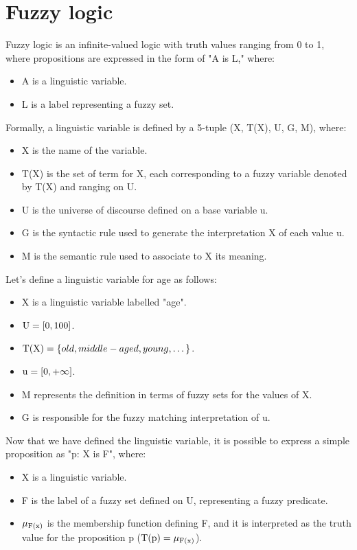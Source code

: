 \documentclass[12pt, a4paper]{report}
\begin{document}
    \section{Fuzzy logic}
    Fuzzy logic is an infinite-valued logic with truth values ranging from 0 to 1, where propositions are expressed in the form of "A is L," where:
    \begin{itemize}
        \item A is a linguistic variable.
        \item L is a label representing a fuzzy set.
    \end{itemize}
    Formally, a linguistic variable is defined by a 5-tuple (X, T(X), U, G, M), where: 
    \begin{itemize}
        \item X is the name of the variable.
        \item T(X) is the set of term for X, each corresponding to a fuzzy variable denoted by T(X) and ranging on U.
        \item U is the universe of discourse defined on a base variable u.
        \item G is the syntactic rule used to generate the interpretation X of each value u.
        \item M is the semantic rule used to associate to X its meaning.
    \end{itemize}
    \begin{example}
        Let's define a linguistic variable for age as follows:
        \begin{itemize}
            \item X is a linguistic variable labelled "age".
            \item $\textnormal{U}=[0,100]$.
            \item $\textnormal{T(X)}=\{old, middle-aged, young, \dots\}$.
            \item $\textnormal{u}=[0,+\infty]$.
            \item M represents the definition in terms of fuzzy sets for the values of X.
            \item G is responsible for the fuzzy matching interpretation of u.
        \end{itemize}
    \end{example}
    Now that we have defined the linguistic variable, it is possible to express a simple proposition as "p: X is F", where:
    \begin{itemize}
        \item X is a linguistic variable.
        \item F is the label of a fuzzy set defined on U, representing a fuzzy predicate.
        \item $\mu_{\textnormal{F(x)}}$ is the membership function defining F, and it is interpreted as the truth value for the proposition p ($\textnormal{T(p)}=\mu_{\textnormal{F(x)}}$).
    \end{itemize}
\end{document}

